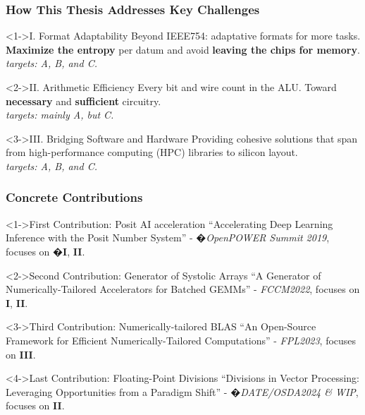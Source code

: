\begin{frame}
    \frametitle{How This Thesis Addresses Key Challenges}
    \begin{block}<1->{I. Format Adaptability}
	    Beyond IEEE754: adaptative formats for more tasks. \textbf{Maximize the entropy} per datum and avoid \textbf{leaving the chips for memory}.
	    \\ \textit{targets: A, B, and C.}
    \end{block}

    \begin{block}<2->{II. Arithmetic Efficiency}
	    Every bit and wire count in the ALU. Toward \textbf{necessary} and \textbf{sufficient} circuitry.
	    \\ \textit{targets: mainly A, but C.}
    \end{block}

    \begin{block}<3->{III. Bridging Software and Hardware}
	    Providing cohesive solutions that span from high-performance computing (HPC) libraries to silicon layout.
	    \\ \textit{targets: A, B, and C.}
    \end{block}
\end{frame}

\begin{frame}
    \frametitle{Concrete Contributions}

    \begin{block}<1->{First Contribution: Posit AI acceleration}
	    ``Accelerating Deep Learning Inference with the Posit Number System'' - �\textit{OpenPOWER Summit 2019}, focuses on �\textbf{I}, \textbf{II}.
    \end{block}
	\vspace{-3pt}

    \begin{block}<2->{Second Contribution: Generator of Systolic Arrays}
	    ``A Generator of Numerically-Tailored Accelerators for Batched GEMMs'' - \textit{FCCM2022}, focuses on \textbf{I}, \textbf{II}.
    \end{block}
	\vspace{-3pt}

    \begin{block}<3->{Third Contribution: Numerically-tailored BLAS}
	    ``An Open-Source Framework for Efficient Numerically-Tailored Computations'' - \textit{FPL2023}, focuses on \textbf{III}.
    \end{block}
	\vspace{-3pt}

    \begin{block}<4->{Last Contribution: Floating-Point Divisions}
	    ``Divisions in Vector Processing: Leveraging Opportunities from a Paradigm Shift'' - �\textit{DATE/OSDA2024 \& WIP}, focuses on \textbf{II}.
    \end{block}


\end{frame}

